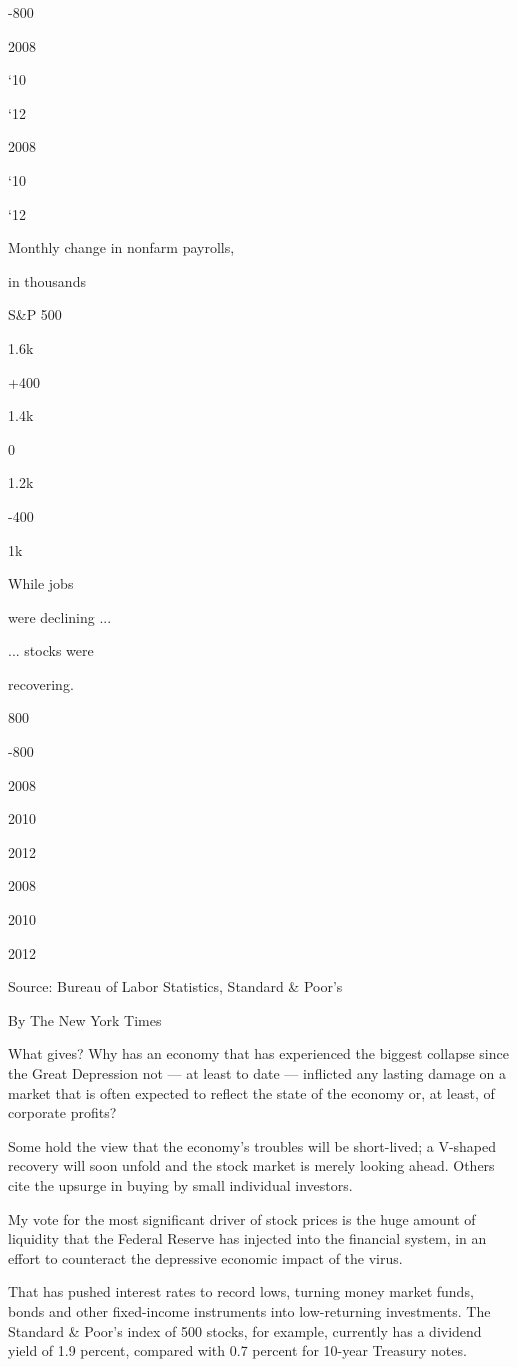 -800

2008

`10

`12

2008

`10

`12

Monthly change in nonfarm payrolls,

in thousands

S\&P 500

1.6k

+400

1.4k

0

1.2k

-400

1k

While jobs

were declining ...

... stocks were

recovering.

800

-800

2008

2010

2012

2008

2010

2012

Source: Bureau of Labor Statistics, Standard \& Poor's

By The New York Times

What gives? Why has an economy that has experienced the biggest collapse
since the Great Depression not --- at least to date --- inflicted any
lasting damage on a market that is often expected to reflect the state
of the economy or, at least, of corporate profits?

Some hold the view that the economy's troubles will be short-lived; a
V-shaped recovery will soon unfold and the stock market is merely
looking ahead. Others cite the upsurge in buying by small individual
investors.

My vote for the most significant driver of stock prices is the huge
amount of liquidity that the Federal Reserve has injected into the
financial system, in an effort to counteract the depressive economic
impact of the virus.

That has pushed interest rates to record lows, turning money market
funds, bonds and other fixed-income instruments into low-returning
investments. The Standard \& Poor's index of 500 stocks, for example,
currently has a dividend yield of 1.9 percent, compared with 0.7 percent
for 10-year Treasury notes.

